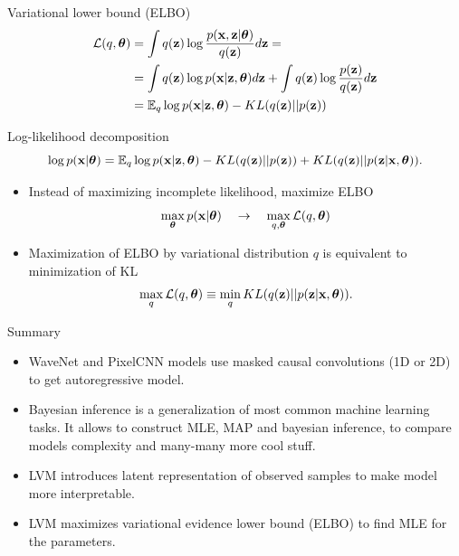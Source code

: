\begin{frame}{Variational lower bound (ELBO)}
	\vspace{-0.3cm}
	\begin{align*}
 	 \mathcal{L} (q, \boldsymbol{\theta}) &= \int q(\mathbf{z}) \log \frac{p(\mathbf{x}, \mathbf{z} | \boldsymbol{\theta})}{q(\mathbf{z})}d\mathbf{z} = \\ 
	  &= \int q(\mathbf{z}) \log p(\mathbf{x} | \mathbf{z}, \boldsymbol{\theta}) d\mathbf{z} + \int q(\mathbf{z}) \log \frac{p(\mathbf{z})}{q(\mathbf{z})}d\mathbf{z} \\ 
	  &= \mathbb{E}_{q} \log p(\mathbf{x} | \mathbf{z}, \boldsymbol{\theta}) - KL (q(\mathbf{z}) || p(\mathbf{z}))
	\end{align*}
	\vspace{-0.5cm}
	\begin{block}{Log-likelihood decomposition}
		\vspace{-0.5cm}
		\[
			 \log p(\mathbf{x}| \boldsymbol{\theta}) = \mathbb{E}_{q} \log p(\mathbf{x} | \mathbf{z}, \boldsymbol{\theta}) - KL (q(\mathbf{z}) || p(\mathbf{z})) + KL(q(\mathbf{z}) || p(\mathbf{z}|\mathbf{x}, \boldsymbol{\theta})).
		\]
	\end{block}
	\begin{itemize}
	\item Instead of maximizing incomplete likelihood, maximize ELBO
   	\[
	    \max_{\boldsymbol{\theta}} p(\mathbf{x} | \boldsymbol{\theta}) \quad \rightarrow \quad \max_{q, \boldsymbol{\theta}} \mathcal{L} (q, \boldsymbol{\theta})
   	\]
   	\item Maximization of ELBO by variational distribution $q$ is equivalent to minimization of KL
  	\[
	    \max_q \mathcal{L} (q, \boldsymbol{\theta}) \equiv \min_q KL(q(\mathbf{z}) || p(\mathbf{z}|\mathbf{x}, \boldsymbol{\theta})).
  	\]
  	\end{itemize}
	   	    
\end{frame}
\begin{frame}{Summary}
	\begin{itemize}
		\item WaveNet and PixelCNN models use masked causal convolutions (1D or 2D) to get autoregressive model.
		\vfill
		\item Bayesian inference is a generalization of most common machine learning tasks. It allows to construct MLE, MAP and bayesian inference, to compare models complexity and many-many more cool stuff.
		\vfill
		\item LVM introduces latent representation of observed samples to make model more interpretable.
		\vfill
		\item LVM maximizes variational evidence lower bound (ELBO) to find MLE for the parameters.
	\end{itemize}
\end{frame}
 